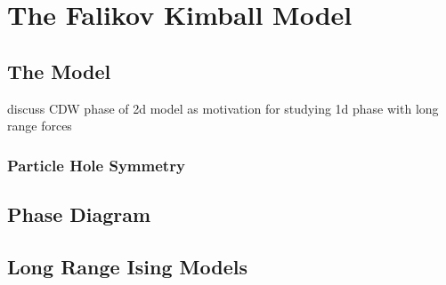 \hypertarget{the-falikov-kimball-model}{%
\section{The Falikov Kimball Model}\label{the-falikov-kimball-model}}

\hypertarget{the-model}{%
\subsection{The Model}\label{the-model}}

discuss CDW phase of 2d model as motivation for studying 1d phase with long range forces

\hypertarget{particle-hole-symmetry}{%
\subsubsection{Particle Hole Symmetry}\label{particle-hole-symmetry}}

\hypertarget{phase-diagram}{%
\subsection{Phase Diagram}\label{phase-diagram}}

\hypertarget{long-range-ising-models}{%
\subsection{Long Range Ising Models}\label{long-range-ising-models}}

\begin{Shaded}
\begin{Highlighting}[]

\end{Highlighting}
\end{Shaded}
